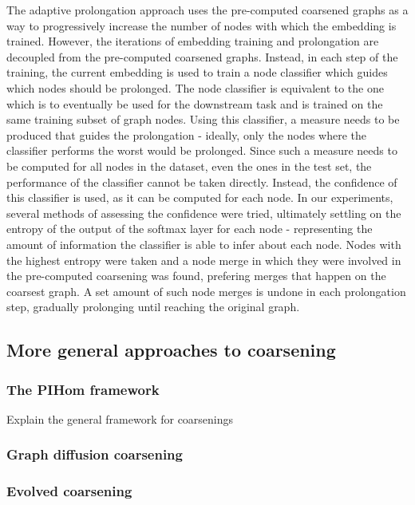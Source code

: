 The adaptive prolongation approach uses the pre-computed coarsened graphs as a way to progressively increase the number of nodes with which the embedding is trained. However, the iterations of embedding training and prolongation are decoupled from the pre-computed coarsened graphs. Instead, in each step of the training, the current embedding is used to train a node classifier which guides which nodes should be prolonged. The node classifier is equivalent to the one which is to eventually be used for the downstream task and is trained on the same training subset of graph nodes. Using this classifier, a measure needs to be produced that guides the prolongation - ideally, only the nodes where the classifier performs the worst would be prolonged. Since such a measure needs to be computed for all nodes in the dataset, even the ones in the test set, the performance of the classifier cannot be taken directly. Instead, the confidence of this classifier is used, as it can be computed for each node. In our experiments, several methods of assessing the confidence were tried, ultimately settling on the entropy of the output of the softmax layer for each node - representing the amount of information the classifier is able to infer about each node. Nodes with the highest entropy were taken and a node merge in which they were involved in the pre-computed coarsening was found, prefering merges that happen on the coarsest graph. A set amount of such node merges is undone in each prolongation step, gradually prolonging until reaching the original graph.

\subsection{More general approaches to coarsening}\label{sec:coarsening-algorithms}

\subsubsection{The PIHom framework}
Explain the general framework for coarsenings

\subsubsection{Graph diffusion coarsening}

\subsubsection{Evolved coarsening}
